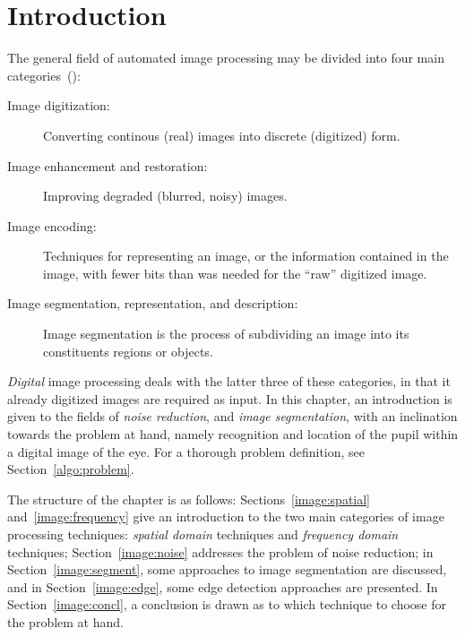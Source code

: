 
\section{Introduction}
\label{image:intro}

The general field of automated image processing may be divided into
four main categories~(\cite{digim}):

\begin{description}
\item[Image digitization:] Converting continous (real) images into
  discrete (digitized) form.
\item[Image enhancement and restoration:] Improving degraded (blurred,
  noisy) images.
\item[Image encoding:] Techniques for representing an image, or the
  information contained in the image, with fewer bits than was needed
  for the ``raw'' digitized image.
\item[Image segmentation, representation, and description:] Image
  segmentation is the process of subdividing an image into its
  constituents regions or objects.
\end{description}

{\em Digital\/} image processing deals with the latter three of these
categories, in that it already digitized images are required as input.
In this chapter, an introduction is given to the fields of {\em noise
  reduction\/}, and {\em image segmentation\/}, with an inclination
towards the problem at hand, namely recognition and location of the
pupil within a digital image of the eye.  For a thorough problem
definition, see Section~\ref{algo:problem}.

The structure of the chapter is as follows:
Sections~\ref{image:spatial} and~\ref{image:frequency} give an
introduction to the two main categories of image processing
techniques: {\em spatial domain\/} techniques and {\em frequency
  domain\/} techniques; Section~\ref{image:noise} addresses the
problem of noise reduction; in Section~\ref{image:segment}, some
approaches to image segmentation are discussed, and in
Section~\ref{image:edge}, some edge detection approaches are
presented.  In Section~\ref{image:concl}, a conclusion is drawn as to
which technique to choose for the problem at hand.
